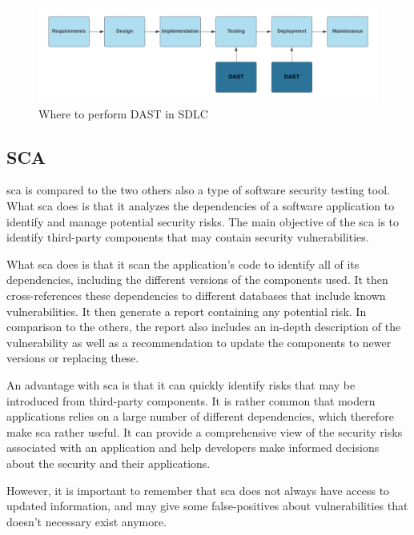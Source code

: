\begin{figure}[htp]
    \centering
    \includegraphics[width=1\columnwidth]{Images/DAST.png}
    \caption{Where to perform DAST in SDLC}
    \label{fig:my_label}
\end{figure}

\newpage

\subsection{SCA}
\acrlong{sca} is compared to the two others also a type of software security testing tool. What \acrshort{sca} does is that it analyzes the dependencies of a software application to identify and manage potential security risks. The main objective of the \acrshort{sca} is to identify third-party components that may contain security vulnerabilities. \cite{sca}

What \acrshort{sca} does is that it scan the application's code to identify all of its dependencies, including the different versions of the components used. It then cross-references these dependencies to different databases that include known vulnerabilities. It then generate a report containing any potential risk. In comparison to the others, the report also includes an in-depth description of the vulnerability as well as a recommendation to update the components to newer versions or replacing these. 

An advantage with \acrshort{sca} is that it can quickly identify risks that may be introduced from third-party components. It is rather common that modern applications relies on a large number of  different dependencies, which therefore make \acrshort{sca} rather useful. It can provide a comprehensive view of the security risks associated with an application and help developers make informed decisions about the security and their applications. 

However, it is important to remember that \acrshort{sca} does not always have access to updated information, and may give some false-positives about vulnerabilities that doesn't necessary exist anymore. 

